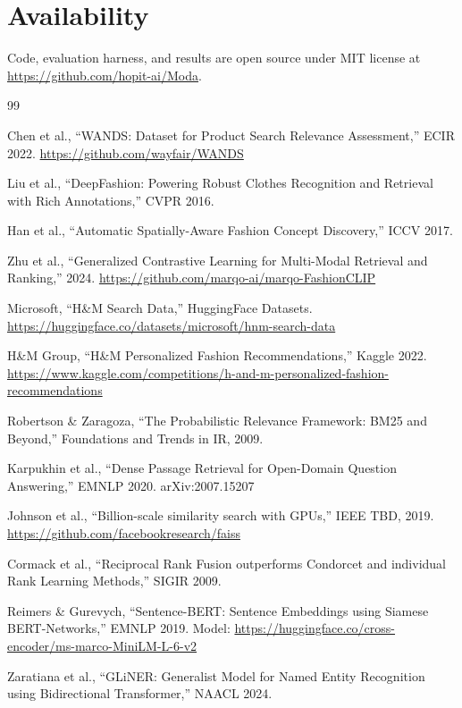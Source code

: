 \documentclass[11pt,a4paper]{article}
\begin{document}
\section*{Availability}

Code, evaluation harness, and results are open source under MIT license at \url{https://github.com/hopit-ai/Moda}.

\begin{thebibliography}{99}

 Chen et al., ``WANDS: Dataset for Product Search Relevance Assessment,'' ECIR 2022. \url{https://github.com/wayfair/WANDS}

 Liu et al., ``DeepFashion: Powering Robust Clothes Recognition and Retrieval with Rich Annotations,'' CVPR 2016.

 Han et al., ``Automatic Spatially-Aware Fashion Concept Discovery,'' ICCV 2017.

 Zhu et al., ``Generalized Contrastive Learning for Multi-Modal Retrieval and Ranking,'' 2024. \url{https://github.com/marqo-ai/marqo-FashionCLIP}

 Microsoft, ``H\&M Search Data,'' HuggingFace Datasets. \url{https://huggingface.co/datasets/microsoft/hnm-search-data}

 H\&M Group, ``H\&M Personalized Fashion Recommendations,'' Kaggle 2022. \url{https://www.kaggle.com/competitions/h-and-m-personalized-fashion-recommendations}

 Robertson \& Zaragoza, ``The Probabilistic Relevance Framework: BM25 and Beyond,'' Foundations and Trends in IR, 2009.

 Karpukhin et al., ``Dense Passage Retrieval for Open-Domain Question Answering,'' EMNLP 2020. arXiv:2007.15207

 Johnson et al., ``Billion-scale similarity search with GPUs,'' IEEE TBD, 2019. \url{https://github.com/facebookresearch/faiss}

 Cormack et al., ``Reciprocal Rank Fusion outperforms Condorcet and individual Rank Learning Methods,'' SIGIR 2009.

 Reimers \& Gurevych, ``Sentence-BERT: Sentence Embeddings using Siamese BERT-Networks,'' EMNLP 2019. Model: \url{https://huggingface.co/cross-encoder/ms-marco-MiniLM-L-6-v2}

 Zaratiana et al., ``GLiNER: Generalist Model for Named Entity Recognition using Bidirectional Transformer,'' NAACL 2024.


\end{thebibliography}
\end{document}
